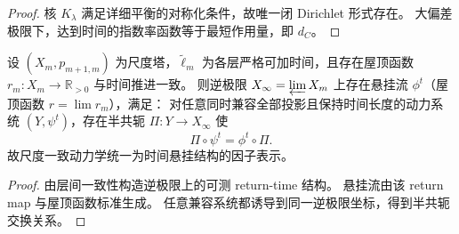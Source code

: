 \begin{proof}
核 \(K_\lambda\) 满足详细平衡的对称化条件，故唯一闭 Dirichlet 形式存在。
大偏差极限下，达到时间的指数率函数等于最短作用量，即 \(d_C\)。
\end{proof}

\begin{theorem}\label{thm:xi-suspension-flow-universality}
设 \((X_m,p_{m+1,m})\) 为尺度塔，\(\widetilde\ell_m\) 为各层严格可加时间，且存在屋顶函数 \(r_m:X_m\to\mathbb R_{>0}\) 与时间推进一致。
则逆极限 \(X_\infty=\varprojlim X_m\) 上存在悬挂流 \(\phi^t\)（屋顶函数 \(r=\lim r_m\)），满足：
对任意同时兼容全部投影且保持时间长度的动力系统 \((Y,\psi^t)\)，存在半共轭 \(\Pi:Y\to X_\infty\) 使
\[
\Pi\circ\psi^t=\phi^t\circ\Pi.
\]
故尺度一致动力学统一为时间悬挂结构的因子表示。
\end{theorem}

\begin{proof}
由层间一致性构造逆极限上的可测 return-time 结构。
悬挂流由该 return map 与屋顶函数标准生成。
任意兼容系统都诱导到同一逆极限坐标，得到半共轭交换关系。
\end{proof}
